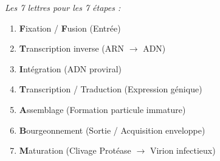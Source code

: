 \documentclass[11pt]{article}
\begin{document}
\begin{methode}
\emph{Les 7 lettres pour les 7 étapes :}
\begin{enumerate}
    \item \textbf{F}ixation / \textbf{F}usion (Entrée)
    \item \textbf{T}ranscription inverse (ARN $\to$ ADN)
    \item \textbf{I}ntégration (ADN proviral)
    \item \textbf{T}ranscription / Traduction (Expression génique)
    \item \textbf{A}ssemblage (Formation particule immature)
    \item \textbf{B}ourgeonnement (Sortie / Acquisition enveloppe)
    \item \textbf{M}aturation (Clivage Protéase $\to$ Virion infectieux)
\end{enumerate}
\end{methode}
\end{document}
